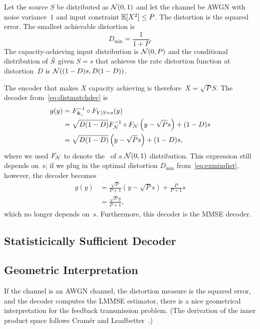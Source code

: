 \begin{example}
  Let the source $S$ be distributed as ${\mathcal{N}}(0,1)$ and let the channel be AWGN
  with noise variance~$1$ and input constraint $\mathbb{E}[X^2] \le P$.
  The distortion is the squared error. The smallest achievable distortion is
  \begin{equation}
    \label{eq:exmindist}
    D_{\min} = \frac{1}{1 + P}.
  \end{equation}
  The capacity-achieving input distribution is ${\mathcal{N}}(0,P)$ and the conditional
  distribution of ${\hat{S}}$ given $S=s$ that achieves the rate distortion function
  at distortion~$D$ is ${\mathcal{N}}((1-D)s, D(1-D))$.
  
  The encoder that makes $X$ capacity achieving is therefore~$X = \sqrt{P}S$.
  The decoder from~\eqref{eq:distmatchdec} is
  \begin{align*}
    g(y) &= F_{\Phi_s}^{-1} \circ F_{Y|S=s}(y) \\
    &= \sqrt{D(1-D)} F_{{\mathcal{N}}}^{-1} \circ F_{{\mathcal{N}}}\left( y-\sqrt{P}s
    \right) + (1-D)s \\
    &= \sqrt{D(1-D)} \left( y-\sqrt{P}s \right) + (1-D)s,
  \end{align*}
  where we used $F_{{\mathcal{N}}}$ to denote the \cdf\ of a ${\mathcal{N}}(0,1)$ distribution.
  This expression still depends on~$s$; if we plug in the optimal distortion
  $D_{\min}$ from~\eqref{eq:exmindist}, however, the decoder becomes
  \begin{align*}
    g(y) &= \frac{\sqrt{P}}{P+1} (y - \sqrt{P}s) + \frac{P}{P +
    1}s \\ 
    &= \frac{\sqrt{P}y}{P + 1},
  \end{align*}
  which no longer depends on~$s$. Furthermore, this decoder is the MMSE decoder.
\end{example}

\subsection{Statisticically Sufficient Decoder}


\subsection{Geometric Interpretation}

If the channel is an AWGN channel, the distortion measure is the squared error,
and the decoder computes the LMMSE estimator, there is a nice geometrical
interpretation for the feedback transmission problem. (The derivation of the
inner product space follows Cramér and
Leadbetter~\cite[Section~5.6]{CramerL1967}.)

